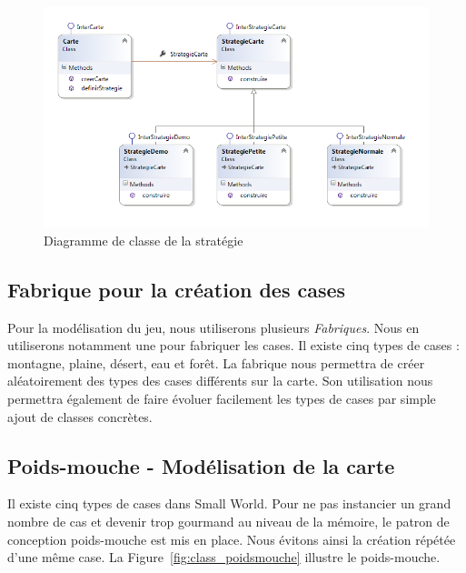 \documentclass[a4paper]{article}%
\begin{document}
\begin{figure}[H]
    \centering
    \includegraphics[width=\textwidth]{./images/classe/strategie.png}
		\caption{Diagramme de classe de la stratégie}
		\label{fig:class_strategie}
\end{figure}

\subsection{Fabrique pour la création des cases}
Pour la modélisation du jeu, nous utiliserons plusieurs \textit{Fabriques}. 
Nous en utiliserons notamment une pour fabriquer les cases. Il existe cinq types de cases : montagne, plaine, désert, eau et forêt.
La fabrique nous permettra de créer aléatoirement des types des cases différents sur la carte.
Son utilisation nous permettra également de faire évoluer facilement les types de cases par simple ajout de classes concrètes.


\subsection{Poids-mouche - Modélisation de la carte}

Il existe cinq types de cases dans Small World. Pour ne pas instancier un grand nombre de cas et devenir trop gourmand au niveau de la mémoire, le patron de conception poids-mouche est mis en place. Nous évitons ainsi la création répétée d'une même case. La Figure~\ref{fig:class_poidsmouche} illustre le poids-mouche.
\end{document}
